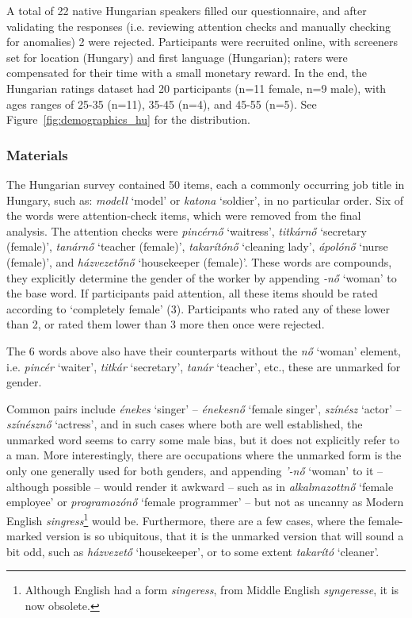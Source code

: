 \documentclass[11pt]{article}
\begin{document}
A total of 22 native Hungarian speakers filled our questionnaire, and after validating the responses (i.e. reviewing attention checks and manually checking for anomalies) 2 were rejected. Participants were recruited online, with screeners set for location (Hungary) and first language (Hungarian); raters were compensated for their time with a small monetary reward. In the end, the Hungarian ratings dataset had 20 participants (n=11 female, n=9 male), with ages ranges of 25-35 (n=11), 35-45 (n=4), and 45-55 (n=5). See Figure~\ref{fig:demographics_hu} for the distribution.

\subsubsection{Materials}

The Hungarian survey contained 50 items, each a commonly occurring job title in Hungary, such as: \textit{modell} `model' or \textit{katona} `soldier', in no particular order. Six of the words were attention-check items, which were removed from the final analysis. The attention checks were \textit{pincérnő} `waitress', \textit{titkárnő} `secretary (female)', \textit{tanárnő} `teacher (female)', \textit{takarítónő} `cleaning lady', \textit{ápolónő} `nurse (female)', and \textit{házvezetőnő} `housekeeper (female)'. These words are compounds, they explicitly determine the gender of the worker by appending \textit{-nő} `woman' to the base word. If participants paid attention, all these items should be rated according to `completely female' (3). Participants who rated any of these lower than 2, or rated them lower than 3 more then once were rejected.

The 6 words above also have their counterparts without the \textit{nő} `woman' element, i.e. \textit{pincér} `waiter', \textit{titkár} `secretary', \textit{tanár} `teacher', etc., these are unmarked for gender.

Common pairs include \textit{énekes} `singer' -- \textit{énekesnő} `female singer', \textit{színész} `actor' -- \textit{színésznő} `actress', and in such cases where both are well established, the unmarked word seems to carry some male bias, but it does not explicitly refer to a man. More interestingly, there are occupations where the unmarked form is the only one generally used for both genders, and appending \textit{'-nő} `woman' to it -- although possible -- would render it awkward -- such as in \textit{alkalmazottnő} `female employee' or \textit{programozónő} `female programmer' -- but not as uncanny as Modern English \textit{singress}\footnote{Although English had a form \textit{singeress}, from Middle English \textit{syngeresse}, it is now obsolete.} would be. Furthermore, there are a few cases, where the female-marked version is so ubiquitous, that it is the unmarked version that will sound a bit odd, such as \textit{házvezető} `housekeeper', or to some extent \textit{takarító} `cleaner'.
\end{document}
